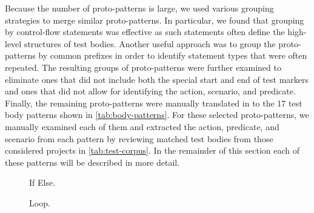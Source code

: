 \documentclass[proposal.tex]{subfiles}
\begin{document}
Because the number of proto-patterns is large, we used various grouping strategies to merge similar proto-patterns.
%
In particular, we found that grouping by control-flow statements was effective as such statements often define the high-level structures of test bodies.
%
Another useful approach was to group the proto-patterns by common prefixes in order to identify statement types that were often repeated.
%
The resulting groups of proto-patterns were further examined to eliminate ones that did not include both the special start and end of test markers and ones that did not allow for identifying the action, scenario, and predicate.
%
Finally, the remaining proto-patterns were manually translated in to the \num{17} test body patterns shown in \cref{tab:body-patterns}.
For these selected proto-patterns, we manually examined each of them and extracted the action, predicate, and scenario from each pattern by reviewing matched test bodies from those considered projects in \cref{tab:test-corpus}.
%
In the remainder of this section each of these patterns will be described in more detail.

\begin{figure}[t]
\centering
    \begin{subfigure}{0.6\textwidth}
    \end{subfigure}
\caption{If Else.}
\label{ifElse}
\end{figure}
\begin{figure}[t]
\centering
    \begin{subfigure}{0.65\textwidth}
    \end{subfigure}
\caption{Loop.}
\label{loopPattern}
\end{figure}
\end{document}
